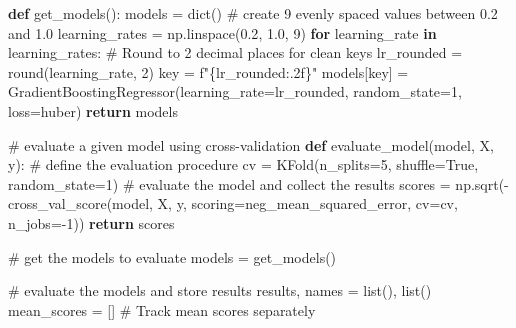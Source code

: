 \documentclass[
  letterpaper,
  DIV=11,
  numbers=noendperiod]{scrreprt}
\newenvironment{Shaded}{\begin{snugshade}}{\end{snugshade}}
\newcommand{\BuiltInTok}[1]{\textcolor[rgb]{0.00,0.23,0.31}{#1}}
\newcommand{\CommentTok}[1]{\textcolor[rgb]{0.37,0.37,0.37}{#1}}
\newcommand{\ControlFlowTok}[1]{\textcolor[rgb]{0.00,0.23,0.31}{\textbf{#1}}}
\newcommand{\DecValTok}[1]{\textcolor[rgb]{0.68,0.00,0.00}{#1}}
\newcommand{\FloatTok}[1]{\textcolor[rgb]{0.68,0.00,0.00}{#1}}
\newcommand{\KeywordTok}[1]{\textcolor[rgb]{0.00,0.23,0.31}{\textbf{#1}}}
\newcommand{\NormalTok}[1]{\textcolor[rgb]{0.00,0.23,0.31}{#1}}
\newcommand{\OperatorTok}[1]{\textcolor[rgb]{0.37,0.37,0.37}{#1}}
\newcommand{\SpecialCharTok}[1]{\textcolor[rgb]{0.37,0.37,0.37}{#1}}
\newcommand{\SpecialStringTok}[1]{\textcolor[rgb]{0.13,0.47,0.30}{#1}}
\newcommand{\StringTok}[1]{\textcolor[rgb]{0.13,0.47,0.30}{#1}}
\newcommand{\VariableTok}[1]{\textcolor[rgb]{0.07,0.07,0.07}{#1}}
\begin{document}
\begin{Shaded}
\begin{Highlighting}[]
\KeywordTok{def}\NormalTok{ get\_models():}
\NormalTok{    models }\OperatorTok{=} \BuiltInTok{dict}\NormalTok{()}
    \CommentTok{\# create 9 evenly spaced values between 0.2 and 1.0}
\NormalTok{    learning\_rates }\OperatorTok{=}\NormalTok{ np.linspace(}\FloatTok{0.2}\NormalTok{, }\FloatTok{1.0}\NormalTok{, }\DecValTok{9}\NormalTok{)}
    \ControlFlowTok{for}\NormalTok{ learning\_rate }\KeywordTok{in}\NormalTok{ learning\_rates:}
        \CommentTok{\# Round to 2 decimal places for clean keys}
\NormalTok{        lr\_rounded }\OperatorTok{=} \BuiltInTok{round}\NormalTok{(learning\_rate, }\DecValTok{2}\NormalTok{)}
\NormalTok{        key }\OperatorTok{=} \SpecialStringTok{f"}\SpecialCharTok{\{}\NormalTok{lr\_rounded}\SpecialCharTok{:.2f\}}\SpecialStringTok{"}
\NormalTok{        models[key] }\OperatorTok{=}\NormalTok{ GradientBoostingRegressor(learning\_rate}\OperatorTok{=}\NormalTok{lr\_rounded, random\_state}\OperatorTok{=}\DecValTok{1}\NormalTok{, loss}\OperatorTok{=}\StringTok{\textquotesingle{}huber\textquotesingle{}}\NormalTok{)}
    \ControlFlowTok{return}\NormalTok{ models}

\CommentTok{\# evaluate a given model using cross{-}validation}
\KeywordTok{def}\NormalTok{ evaluate\_model(model, X, y):}
    \CommentTok{\# define the evaluation procedure}
\NormalTok{    cv }\OperatorTok{=}\NormalTok{ KFold(n\_splits}\OperatorTok{=}\DecValTok{5}\NormalTok{, shuffle}\OperatorTok{=}\VariableTok{True}\NormalTok{, random\_state}\OperatorTok{=}\DecValTok{1}\NormalTok{)}
    \CommentTok{\# evaluate the model and collect the results}
\NormalTok{    scores }\OperatorTok{=}\NormalTok{ np.sqrt(}\OperatorTok{{-}}\NormalTok{cross\_val\_score(model, X, y, scoring}\OperatorTok{=}\StringTok{\textquotesingle{}neg\_mean\_squared\_error\textquotesingle{}}\NormalTok{, cv}\OperatorTok{=}\NormalTok{cv, n\_jobs}\OperatorTok{={-}}\DecValTok{1}\NormalTok{))}
    \ControlFlowTok{return}\NormalTok{ scores}

\CommentTok{\# get the models to evaluate}
\NormalTok{models }\OperatorTok{=}\NormalTok{ get\_models()}

\CommentTok{\# evaluate the models and store results}
\NormalTok{results, names }\OperatorTok{=} \BuiltInTok{list}\NormalTok{(), }\BuiltInTok{list}\NormalTok{()}
\NormalTok{mean\_scores }\OperatorTok{=}\NormalTok{ []  }\CommentTok{\# Track mean scores separately}


\end{Highlighting}
\end{Shaded}
\end{document}
